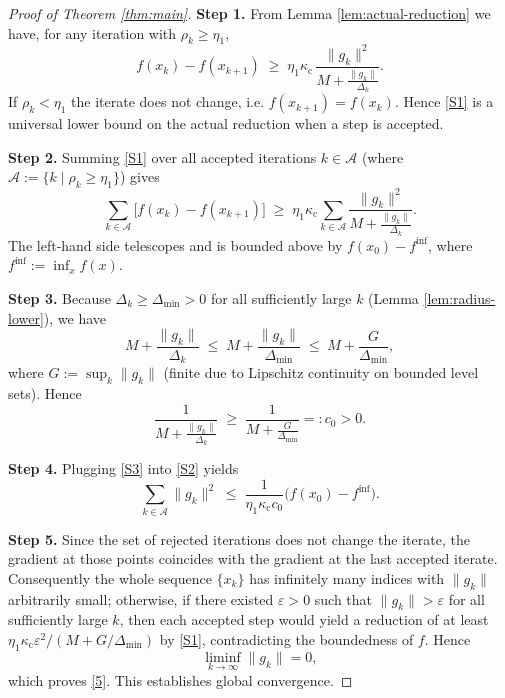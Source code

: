 \documentclass{article}
\begin{document}
\begin{proof}[Proof of Theorem \ref{thm:main}]
\textbf{Step 1.}  From Lemma \ref{lem:actual-reduction} we have,
for any iteration with \(\rho_{k}\ge\eta_{1}\),
\begin{equation}
f(x_{k})-f(x_{k+1})
\;\ge\;
\eta_{1}\kappa_{\mathrm{c}}\,
\frac{\|g_{k}\|^{2}}{M+\frac{\|g_{k}\|}{\Delta_{k}}}.
\tag{S1}
\end{equation}
If \(\rho_{k}<\eta_{1}\) the iterate does not change, i.e.
\(f(x_{k+1})=f(x_{k})\).  Hence \eqref{S1} is a universal lower bound on the
actual reduction when a step is accepted.

\textbf{Step 2.}  Summing \eqref{S1} over all accepted iterations
\(k\in\mathcal{A}\) (where \(\mathcal{A}:=\{k\mid\rho_{k}\ge\eta_{1}\}\))
gives
\[
\sum_{k\in\mathcal{A}}\bigl[f(x_{k})-f(x_{k+1})\bigr]
\;\ge\;
\eta_{1}\kappa_{\mathrm{c}}\sum_{k\in\mathcal{A}}
\frac{\|g_{k}\|^{2}}{M+\frac{\|g_{k}\|}{\Delta_{k}}}.
\tag{S2}
\]
The left‑hand side telescopes and is bounded above by
\(f(x_{0})-f^{\inf}\), where \(f^{\inf}:=\inf_{x}f(x)\).

\textbf{Step 3.}  Because
\(\Delta_{k}\ge\Delta_{\min}>0\) for all sufficiently large \(k\) (Lemma
\ref{lem:radius-lower}), we have
\[
M+\frac{\|g_{k}\|}{\Delta_{k}}
\;\le\;
M+\frac{\|g_{k}\|}{\Delta_{\min}}
\;\le\;
M+\frac{G}{\Delta_{\min}},
\]
where \(G:=\sup_{k}\|g_{k}\|\) (finite due to Lipschitz continuity on bounded
level sets).  Hence
\[
\frac{1}{M+\frac{\|g_{k}\|}{\Delta_{k}}}
\;\ge\;
\frac{1}{M+\frac{G}{\Delta_{\min}}}
=:c_{0}>0.
\tag{S3}
\]

\textbf{Step 4.}  Plugging \eqref{S3} into \eqref{S2} yields
\[
\sum_{k\in\mathcal{A}}\|g_{k}\|^{2}
\;\le\;
\frac{1}{\eta_{1}\kappa_{\mathrm{c}}c_{0}}
\bigl(f(x_{0})-f^{\inf}\bigr).
\tag{S4}
\]

\textbf{Step 5.}  Since the set of rejected iterations does not change the
iterate, the gradient at those points coincides with the gradient at the
last accepted iterate.  Consequently the whole sequence \(\{x_{k}\}\) has
infinitely many indices with \(\|g_{k}\|\) arbitrarily small; otherwise,
if there existed \(\varepsilon>0\) such that \(\|g_{k}\|>\varepsilon\) for
all sufficiently large \(k\), then each accepted step would yield a
reduction of at least
\(\eta_{1}\kappa_{\mathrm{c}}\varepsilon^{2}/(M+G/\Delta_{\min})\) by
\eqref{S1}, contradicting the boundedness of \(f\).  Hence
\[
\liminf_{k\to\infty}\|g_{k}\|=0,
\]
which proves \eqref{5}.  This establishes global convergence.


\end{proof}
\end{document}
